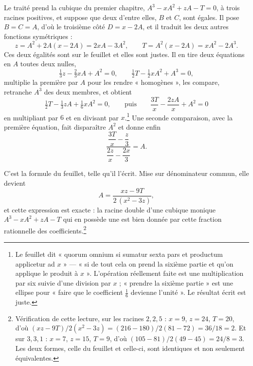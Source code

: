 \documentclass[11pt,a4paper]{article}
\begin{document}
Le traité prend la cubique du premier chapitre, $A^3 - xA^2 + zA - T = 0$, à
trois racines positives, et suppose que deux d'entre elles, $B$ et $C$, sont
égales. Il pose $B = C = A$, d'où le troisième côté $D = x - 2A$, et il traduit
les deux autres fonctions symétriques :
\[ z = A^2 + 2A(x - 2A) = 2xA - 3A^2, \qquad T = A^2(x - 2A) = xA^2 - 2A^3. \]
Ces deux égalités sont sur le feuillet et elles sont justes. Il en tire deux
équations en $A$ toutes deux nulles,
\[ \tfrac13 z - \tfrac23 xA + A^2 = 0, \qquad \tfrac12 T - \tfrac12 xA^2 + A^3 = 0, \]
multiplie la première par $A$ pour les rendre « homogènes », les compare,
retranche $A^3$ des deux membres, et obtient
\[ \tfrac12 T - \tfrac13 zA + \tfrac16 xA^2 = 0, \qquad \text{puis} \qquad \frac{3T}{x} - \frac{2zA}{x} + A^2 = 0 \]
en multipliant par $6$ et en divisant par $x$.\footnote{Le feuillet dit « quorum
omnium si sumatur sexta pars et productum applicetur ad $x$ » — « si de tout
cela on prend la sixième partie et qu'on applique le produit à $x$ ». L'opération
réellement faite est une multiplication par six suivie d'une division par $x$ ;
« prendre la sixième partie » est une ellipse pour « faire que le coefficient
$\tfrac16$ devienne l'unité ». Le résultat écrit est juste.} Une seconde
comparaison, avec la première équation, fait disparaître $A^2$ et donne enfin
\[ \frac{\dfrac{3T}{x} - \dfrac{z}{3}}{\dfrac{2z}{x} - \dfrac{2x}{3}} = A. \]

C'est la formule du feuillet, telle qu'il l'écrit. Mise sur dénominateur commun,
elle devient
\[ A = \frac{xz - 9T}{2\,(x^2 - 3z)}, \]
et cette expression est exacte : la racine double d'une cubique monique
$A^3 - xA^2 + zA - T$ qui en possède une est bien donnée par cette fraction
rationnelle des coefficients.\footnote{Vérification de cette lecture, sur les
racines $2, 2, 5$ : $x = 9$, $z = 24$, $T = 20$, d'où
$(xz - 9T)/2(x^2-3z) = (216-180)/2(81-72) = 36/18 = 2$. Et sur $3, 3, 1$ :
$x = 7$, $z = 15$, $T = 9$, d'où $(105-81)/2(49-45) = 24/8 = 3$. Les deux
formes, celle du feuillet et celle-ci, sont identiques et non seulement
équivalentes.}
\end{document}
